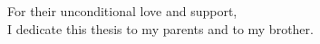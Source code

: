 \begin{dedication}
  For their unconditional love and support,\\
  I dedicate this thesis to my parents and to my brother.
\end{dedication}

